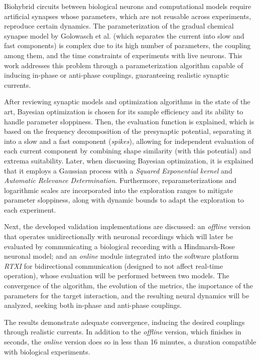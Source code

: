 Biohybrid circuits between biological neurons and computational models require artificial synapses whose parameters, which are not reusable across experiments, reproduce certain dynamics. The parameterization of the gradual chemical synapse model by Golowasch et al. (which separates the current into slow and fast components) is complex due to its high number of parameters, the coupling among them, and the time constraints of experiments with live neurons. This work addresses this problem through a parameterization algorithm capable of inducing in-phase or anti-phase couplings, guaranteeing realistic synaptic currents.

After reviewing synaptic models and optimization algorithms in the state of the art, Bayesian optimization is chosen for its sample efficiency and its ability to handle parameter sloppiness. Then, the evaluation function is explained, which is based on the frequency decomposition of the presynaptic potential, separating it into a slow and a fast component (\textit{spikes}), allowing for independent evaluation of each current component by combining shape similarity (with this potential) and extrema suitability. Later, when discussing Bayesian optimization, it is explained that it employs a Gaussian process with a \textit{Squared Exponential kernel} and \textit{Automatic Relevance Determination}. Furthermore, reparameterizations and logarithmic scales are incorporated into the exploration ranges to mitigate parameter sloppiness, along with dynamic bounds to adapt the exploration to each experiment.

Next, the developed validation implementations are discussed: an \textit{offline} version that operates unidirectionally with neuronal recordings which will later be evaluated by communicating a biological recording with a Hindmarsh-Rose neuronal model; and an \textit{online} module integrated into the software platform \textit{RTXI} for bidirectional communication (designed to not affect real-time operation), whose evaluation will be performed between two models. The convergence of the algorithm, the evolution of the metrics, the importance of the parameters for the target interaction, and the resulting neural dynamics will be analyzed, seeking both in-phase and anti-phase couplings.

The results demonstrate adequate convergence, inducing the desired couplings through realistic currents. In addition to the \textit{offline} version, which finishes in seconds, the \textit{online} version does so in less than 16 minutes, a duration compatible with biological experiments.
